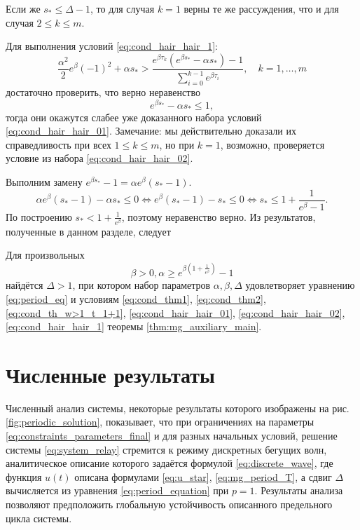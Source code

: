 Если же $s_* \leqslant \Delta - 1$, то для случая $k = 1$ верны те же рассуждения, что и для случая $2 \leqslant k \leqslant m$.

Для выполнения условий \eqref{eq:cond_hair_hair_1}:
\[
\frac{\alpha^2}{2}e^\beta(-1)^2+\alpha s_*>\frac{e^{\beta \tau_k}(e^{\beta s_*}-\alpha s_*)-1}{\sum_{i=0}^{k-1}e^{\beta \tau_i}},\quad k = 1,\ldots, m
\]
достаточно проверить, что верно неравенство
\[
e^{\beta s_*}-\alpha s_* \leqslant 1,
\]
тогда они окажутся слабее уже доказанного набора условий \eqref{eq:cond_hair_hair_01}. Замечание: мы действительно доказали их справедливость при всех $1 \leqslant k \leqslant m$, но при $k = 1$, возможно, проверяется условие из набора \eqref{eq:cond_hair_hair_02}.

Выполним замену $e^{\beta s_*} - 1 = \alpha e^\beta (s_* - 1)$.
%
\[
\alpha e^{\beta}(s_* - 1) - \alpha s_* \leqslant 0 \Leftrightarrow e^{\beta}(s_* - 1) - s_* \leqslant 0 \Leftrightarrow s_* \leqslant 1 + \frac{1}{e^{\beta} - 1}.
\]
%
По построению $s_* < 1 + \frac{1}{e^{\beta}}$, поэтому неравенство верно.
%
Из результатов, полученные в данном разделе, следует
%
\begin{theorem}
	\label{thm:relay_main}
	Для произвольных 
	\begin{equation}
		\label{eq:constraints_parameters_final}
		\beta > 0, \alpha \geq e^{\beta\left(1 + \frac{1}{e^{\beta}}\right)} - 1
	\end{equation}
	найдётся $\Delta > 1$, при котором набор параметров $\alpha, \beta, \Delta$ удовлетворяет уравнению \eqref{eq:period_eq} и условиям \eqref{eq:cond_thm1}, \eqref{eq:cond_thm2}, \eqref{eq:cond_th_w>1_t_1+1}, \eqref{eq:cond_hair_hair_01}, \eqref{eq:cond_hair_hair_02}, \eqref{eq:cond_hair_hair_1} теоремы \ref{thm:mg_auxiliary_main}.
\end{theorem}


\section{Численные результаты}\label{sec:ch2/sect4}
%
Численный анализ системы, некоторые результаты которого изображены на рис. \ref{fig:periodic_solution}, показывает, что при ограничениях на параметры \eqref{eq:constraints_parameters_final} и для разных начальных условий, решение системы \eqref{eq:system_relay} стремится к режиму дискретных бегущих волн, аналитическое описание которого задаётся формулой \eqref{eq:discrete_wave}, где функция $u(t)$ описана формулами \eqref{eq:u_star}, \eqref{eq:mg_period_T}, а сдвиг $\Delta$ вычисляется из уравнения \eqref{eq:period_equation} при $p = 1$. Результаты анализа позволяют предположить глобальную устойчивость описанного предельного цикла системы.

